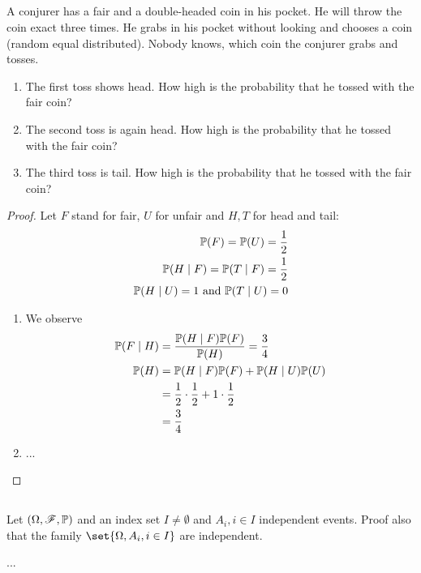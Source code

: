 \subsection{}
A conjurer has a fair and a double-headed coin in his pocket. He will throw the coin exact three times. He grabs in his pocket without looking and chooses a coin (random equal distributed). Nobody knows, which coin the conjurer grabs and tosses.
\begin{enumerate}
	\item The first toss shows head. How high is the probability that he tossed with the fair coin?
	\item The second toss is again head. How high is the probability that he tossed with the fair coin?
	\item The third toss is tail. How high is the probability that he tossed with the fair coin?
\end{enumerate}
\begin{proof}
	Let $F$ stand for fair, $U$ for unfair and $H, T$ for head and tail:
	\begin{align*}
		\mathbb{P}(F) = \mathbb{P}(U) = \frac{1}{2}\\
		\mathbb{P}(H \mid F) = \mathbb{P}(T \mid F) = \frac{1}{2}\\
		\mathbb{P}(H \mid U) = 1 \text{ and } \mathbb{P}(T \mid U) = 0
	\end{align*}
	\begin{enumerate}
		\item We observe
		\begin{align*}
			\mathbb{P}(F \mid H) &= \frac{\mathbb{P}(H \mid F)\mathbb{P}(F)}{\mathbb{P}(H)} = \frac{3}{4}\\
			\mathbb{P}(H) &= \mathbb{P}(H \mid F)\mathbb{P}(F) + \mathbb{P}(H \mid U)\mathbb{P}(U)\\
			&= \frac{1}{2} \cdot \frac{1}{2} + 1 \cdot \frac{1}{2}\\
			&= \frac{3}{4}
		\end{align*}
		\item ... %
	\end{enumerate}
\end{proof}
\subsection{}
Let $(\Omega, \mathscr{F}, \mathbb{P})$ and an index set $I \neq \emptyset$ and $A_i, i \in I$ independent events. Proof also that the family $\set{\Omega, A_i , i \in I}$ are independent.
\begin{solution}
	...
\end{solution}
